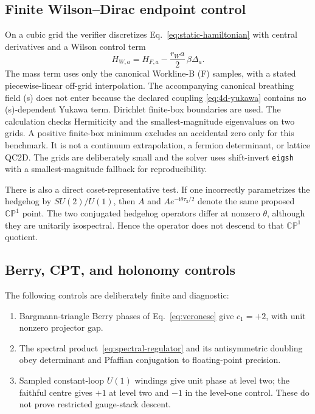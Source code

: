\documentclass[11pt]{article}
\theoremstyle{definition}
\theoremstyle{remark}
\newcommand{\ii}{\mathrm i}
\newcommand{\CP}{\mathbb {CP}}
\begin{document}
\subsection{Finite Wilson--Dirac endpoint control}

On a cubic grid the verifier discretizes Eq.~\eqref{eq:static-hamiltonian}
with central derivatives and a Wilson control term
\begin{equation}
 H_{W,a}=H_{F,a}-\frac{r_Wa}{2}\,\beta\Delta_a.
 \label{eq:wilson-control}
\end{equation}
The mass term uses only the canonical Workline-B (F) samples, with a stated
piecewise-linear off-grid interpolation.  The accompanying canonical
breathing field (s) does not enter because the declared coupling
\eqref{eq:4d-yukawa} contains no (s)-dependent Yukawa term.  Dirichlet
finite-box boundaries are used.  The calculation checks
Hermiticity and the smallest-magnitude eigenvalues on two grids.  A positive
finite-box minimum excludes an accidental zero only for this benchmark.  It
is not a continuum extrapolation, a fermion determinant, or lattice QC2D.
The grids are deliberately small and the solver uses shift-invert
\texttt{eigsh} with a smallest-magnitude fallback for reproducibility.

There is also a direct coset-representative test.  If one incorrectly
parametrizes the hedgehog by \(SU(2)/U(1)\), then \(A\) and
\(Ae^{-\ii\theta\tau_3/2}\) denote the same proposed \(\CP^1\) point.  The
two conjugated hedgehog operators differ at nonzero \(\theta\), although they
are unitarily isospectral.  Hence the operator does not descend to that
\(\CP^1\) quotient.

\subsection{Berry, CPT, and holonomy controls}

The following controls are deliberately finite and diagnostic:
\begin{enumerate}[label=(N\arabic*)]
\item Bargmann-triangle Berry phases of Eq.~\eqref{eq:veronese} give
  \(c_1=+2\), with unit nonzero projector gap.
\item The spectral product~\eqref{eq:spectral-regulator} and its antisymmetric
  doubling obey determinant and Pfaffian conjugation to floating-point
  precision.
\item Sampled constant-loop \(U(1)\) windings give unit phase at level two;
  the faithful centre gives \(+1\) at level two and \(-1\) in the level-one
  control.  These do not prove restricted gauge-stack descent.
\end{enumerate}
\end{document}
